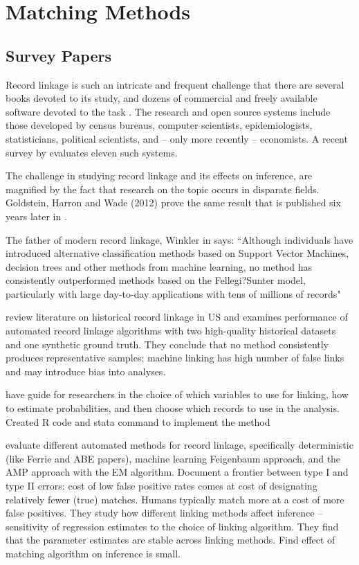 \documentclass[12pt]{article}
\begin{document}
\section{Matching Methods}

\subsection{Survey Papers}

Record linkage is such an intricate and frequent challenge that there are several books devoted to its study, and dozens of commercial and freely available software devoted to the task \citep{christen2012, herzog07}.  The research and open source systems include those developed by census bureaus, computer scientists, epidemiologists, statisticians, political scientists, and -- only more recently -- economists.  A recent survey by \cite{kopcke2010} evaluates eleven such systems.  

The challenge in studying record linkage and its effects on inference, are magnified by the fact that research on the topic occurs in disparate fields.  Goldstein, Harron and Wade (2012) prove the same result that is published six years later in \cite{hirukawa2018}. 

The father of modern record linkage, Winkler in \cite{christen2012} says: ``Although individuals have introduced alternative classification methods based on Support Vector Machines, decision trees and other
methods from machine learning, no method has consistently outperformed methods
based on the Fellegi?Sunter model, particularly with large day-to-day applications
with tens of millions of records"

\cite{bailey2017} review literature on historical record linkage in US and examines performance of automated record linkage algorithms with two high-quality historical datasets and one synthetic ground truth.  They conclude that no method consistently produces representative samples; machine linking has high number of false links and may introduce bias into analyses.  

\cite{arp2018} have guide for researchers in the choice of which variables to use for linking, how to estimate probabilities, and then choose which records to use in the analysis.  Created R code and stata command to implement the method

\cite{abe2019} evaluate different automated methods for record linkage, specifically deterministic (like Ferrie and ABE papers), machine learning Feigenbaum approach, and the AMP approach with the EM algorithm.  Document a frontier between type I and type II errors; cost of low false positive rates comes at cost of designating relatively fewer (true) matches.  Humans typically match more at a cost of more false positives.  They study how different linking methods affect inference -- sensitivity of regression estimates to the choice of linking algorithm.  They find that the parameter estimates are stable across linking methods.  Find effect of matching algorithm on inference is small. 
\end{document}
